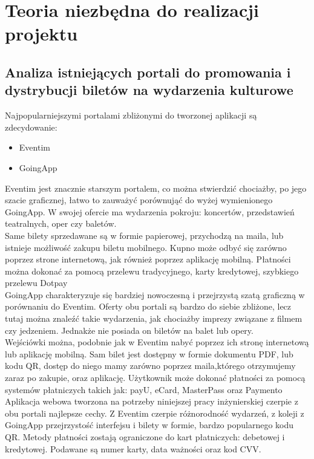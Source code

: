 \documentclass[12pt]{article}
\begin{document}
\begin{sloppypar}
\section{Teoria niezbędna do realizacji projektu}
{
\subsection{Analiza istniejących portali do promowania i dystrybucji biletów na wydarzenia kulturowe}
{
  Najpopularniejszymi portalami zbliżonymi do tworzonej aplikacji są zdecydowanie:
  \begin{itemize}
    \item Eventim
    \item GoingApp
  \end{itemize}
  Eventim jest znacznie starszym portalem, co można stwierdzić chociażby, po jego szacie graficznej,
  łatwo to zauważyć porównująć do wyżej wymienionego GoingApp. 
  W swojej ofercie ma wydarzenia pokroju: koncertów, przedstawień teatralnych, oper czy baletów.\\
  Same bilety sprzedawane są w formie papierowej, przychodzą na maila, 
  lub istnieje możliwość zakupu biletu mobilnego. Kupno może odbyć się zarówno poprzez strone internetową, 
  jak również poprzez aplikację mobilną. Płatności można dokonać za pomocą przelewu tradycyjnego, karty kredytowej, szybkiego przelewu Dotpay\\
  GoingApp charakteryzuje się bardziej nowoczesną i przejrzystą szatą graficzną w porównaniu do Eventim. 
  Oferty obu portali są bardzo do siebie zbliżone, lecz tutaj można znaleźć takie wydarzenia, jak chociażby imprezy związane z filmem czy jedzeniem.
  Jednakże nie posiada on biletów na balet lub opery.\\
  Wejściówki można, podobnie jak w Eventim nabyć poprzez ich stronę internetową lub aplikację mobilną. 
  Sam bilet jest dostępny w formie dokumentu PDF, lub kodu QR, dostęp do niego mamy zarówno poprzez maila,którego otrzymujemy zaraz po zakupie, oraz aplikację.
  Użytkownik może dokonać płatności za pomocą systemów płatniczych takich jak: payU, eCard, MasterPass oraz Paymento\textregistered \\
  Aplikacja webowa tworzona na potrzeby niniejszej pracy inżynierskiej czerpie z obu portali najlepsze cechy. 
  Z Eventim czerpie różnorodność wydarzeń, z koleji z GoingApp przejrzystość interfejsu i bilety w formie, bardzo popularnego kodu QR.
  Metody płatności zostają ograniczone do kart płatniczych: debetowej i kredytowej. Podawane są numer karty, data ważności oraz kod CVV.
}
}
\end{sloppypar}
\end{document}
